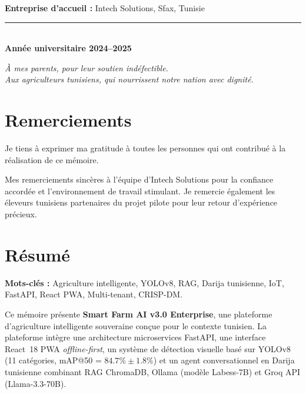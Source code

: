 \documentclass[12pt,a4paper,twoside]{report}
\newcommand{\ic}[2]{$#1 \pm #2$}
\newcounter{hi}
\begin{document}
\begin{titlepage}
\begin{center}
\vspace{1.5cm}
\textbf{Entreprise d'accueil :} Intech Solutions, Sfax, Tunisie

\vfill
\rule{\linewidth}{0.5pt}\\
\textbf{Année universitaire 2024--2025}
\end{center}
\end{titlepage}

\cleardoublepage
\thispagestyle{empty}
\vspace*{\fill}
\begin{center}
\itshape
À mes parents, pour leur soutien indéfectible.\\
Aux agriculteurs tunisiens, qui nourrissent notre nation avec dignité.
\end{center}
\vspace*{\fill}

\cleardoublepage
\thispagestyle{empty}
\chapter*{Remerciements}
Je tiens à exprimer ma gratitude à toutes les personnes qui ont contribué
à la réalisation de ce mémoire.

Mes remerciements sincères à l'équipe d'Intech Solutions pour la confiance
accordée et l'environnement de travail stimulant. Je remercie également
les éleveurs tunisiens partenaires du projet pilote pour leur retour
d'expérience précieux.

\cleardoublepage
\thispagestyle{empty}
\chapter*{Résumé}
\begin{tcolorbox}[colback=gray!5,colframe=gray!50]
\textbf{Mots-clés :} Agriculture intelligente, YOLOv8, RAG, Darija tunisienne,
IoT, FastAPI, React PWA, Multi-tenant, CRISP-DM.
\end{tcolorbox}

\medskip
Ce mémoire présente \textbf{Smart Farm AI v3.0 Enterprise}, une plateforme
d'agriculture intelligente souveraine conçue pour le contexte tunisien.
La plateforme intègre une architecture microservices FastAPI, une interface
React~18 PWA \textit{offline-first}, un système de détection visuelle basé
sur YOLOv8 (11 catégories, mAP@50 = \ic{84.7\%}{1.8\%}) et un agent
conversationnel en Darija tunisienne combinant RAG ChromaDB, Ollama
(modèle Labess-7B) et Groq API (Llama-3.3-70B).
\end{document}
